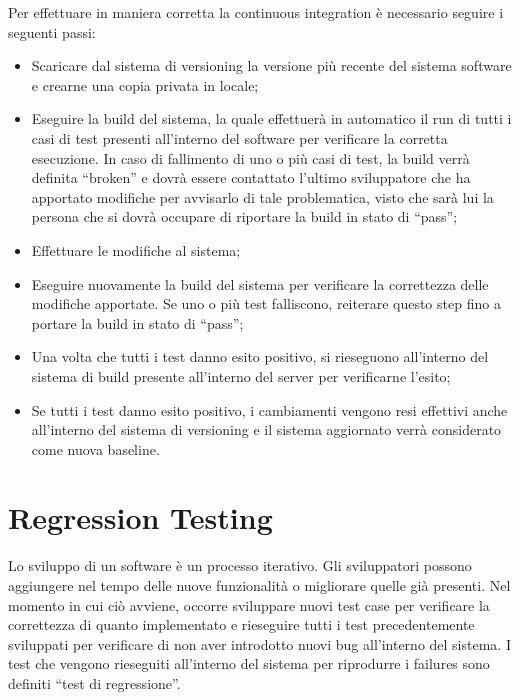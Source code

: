 Per effettuare in maniera corretta la continuous integration è necessario seguire i seguenti passi:
\begin{itemize}
	\item Scaricare dal sistema di versioning la versione più recente del sistema
	software e crearne una copia privata in locale;
	\item Eseguire la build del sistema, la quale effettuerà in automatico il run di tutti
	i casi di test presenti all’interno del software per verificare la corretta
	esecuzione. In caso di fallimento di uno o più casi di test, la build verrà
	definita “broken” e dovrà essere contattato l’ultimo sviluppatore che ha
	apportato modifiche per avvisarlo di tale problematica, visto che sarà lui la
	persona che si dovrà occupare di riportare la build in stato di “pass”;
	\item Effettuare le modifiche al sistema;
	\item Eseguire nuovamente la build del sistema per verificare la correttezza delle
	modifiche apportate. Se uno o più test falliscono, reiterare questo step fino
	a portare la build in stato di “pass”;
	\item Una volta che tutti i test danno esito positivo, si rieseguono all’interno del
	sistema di build presente all’interno del server per verificarne l’esito;
	\item Se tutti i test danno esito positivo, i cambiamenti vengono resi effettivi
	anche all’interno del sistema di versioning e il sistema aggiornato verrà
	considerato come nuova baseline.
\end{itemize}
\section{Regression Testing}
Lo sviluppo di un software è un processo iterativo. Gli sviluppatori possono aggiungere nel tempo delle nuove funzionalità o migliorare quelle già presenti. Nel
momento in cui ciò avviene, occorre sviluppare nuovi test case per verificare la correttezza di quanto implementato e rieseguire tutti i test precedentemente
sviluppati per verificare di non aver introdotto nuovi bug all’interno del sistema. I test che vengono rieseguiti all’interno del sistema per riprodurre i failures sono definiti “test di regressione”.

